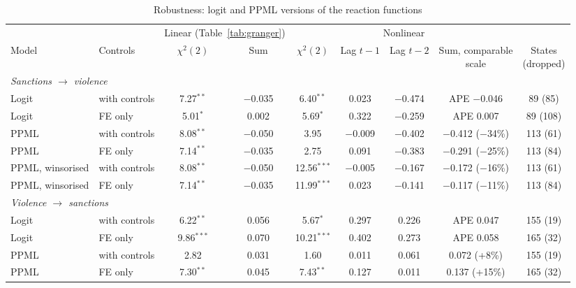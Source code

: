 \begin{table}[htbp]
\centering
\scriptsize\setlength{\tabcolsep}{3pt}
\caption{Robustness: logit and PPML versions of the reaction functions}
\label{tab:nonlinear}
\begin{threeparttable}
\begin{tabular}{llccccccc}
\toprule
 & & \multicolumn{2}{c}{Linear (Table~\ref{tab:granger})} & \multicolumn{4}{c}{Nonlinear} & \\
\cmidrule(lr){3-4}\cmidrule(lr){5-8}
Model & Controls & $\chi^2(2)$ & Sum & $\chi^2(2)$ & Lag $t-1$ & Lag $t-2$ & \makecell{Sum, comparable\\scale} & \makecell{States\\(dropped)} \\
\midrule
\multicolumn{9}{l}{\textit{Sanctions $\rightarrow$ violence}} \\
\quad Logit & with controls & 7.27$^{**}$ & $-$0.035 & 6.40$^{**}$ & 0.023 & $-$0.474 & APE $-$0.046 & 89 (85) \\
\quad Logit & FE only & 5.01$^{*}$ & 0.002 & 5.69$^{*}$ & 0.322 & $-$0.259 & APE 0.007 & 89 (108) \\
\quad PPML & with controls & 8.08$^{**}$ & $-$0.050 & 3.95 & $-$0.009 & $-$0.402 & $-$0.412 ($-$34\%) & 113 (61) \\
\quad PPML & FE only & 7.14$^{**}$ & $-$0.035 & 2.75 & 0.091 & $-$0.383 & $-$0.291 ($-$25\%) & 113 (84) \\
\quad PPML, winsorised & with controls & 8.08$^{**}$ & $-$0.050 & 12.56$^{***}$ & $-$0.005 & $-$0.167 & $-$0.172 ($-$16\%) & 113 (61) \\
\quad PPML, winsorised & FE only & 7.14$^{**}$ & $-$0.035 & 11.99$^{***}$ & 0.023 & $-$0.141 & $-$0.117 ($-$11\%) & 113 (84) \\
\midrule
\multicolumn{9}{l}{\textit{Violence $\rightarrow$ sanctions}} \\
\quad Logit & with controls & 6.22$^{**}$ & 0.056 & 5.67$^{*}$ & 0.297 & 0.226 & APE 0.047 & 155 (19) \\
\quad Logit & FE only & 9.86$^{***}$ & 0.070 & 10.21$^{***}$ & 0.402 & 0.273 & APE 0.058 & 165 (32) \\
\quad PPML & with controls & 2.82 & 0.031 & 1.60 & 0.011 & 0.061 & 0.072 (+8\%) & 155 (19) \\
\quad PPML & FE only & 7.30$^{**}$ & 0.045 & 7.43$^{**}$ & 0.127 & 0.011 & 0.137 (+15\%) & 165 (32) \\
\bottomrule
\end{tabular}
\begin{tablenotes}[flushleft]\footnotesize

\end{tablenotes}
\end{threeparttable}
\end{table}
